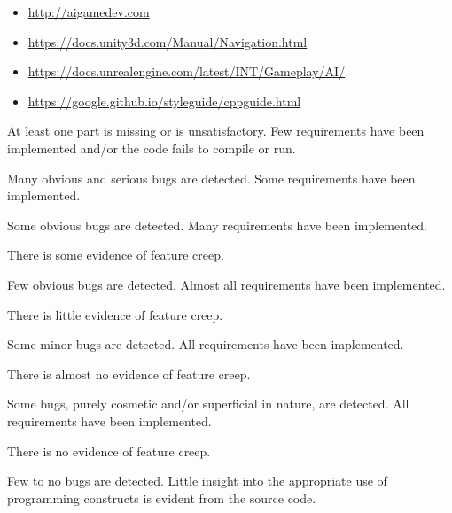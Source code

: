 \begin{itemize}
	\item \url{http://aigamedev.com}
    \item \url{https://docs.unity3d.com/Manual/Navigation.html}
    \item \url{https://docs.unrealengine.com/latest/INT/Gameplay/AI/}
    \item \url{https://google.github.io/styleguide/cppguide.html}
\end{itemize}

\rubricyeartwo
\begin{markingrubric}
		\grade\fail At least one part is missing or is unsatisfactory.
%
        \grade \fail Few requirements have been implemented  and/or the code fails to compile or run.
            \par Many obvious and serious bugs are detected.
        \grade Some requirements have been implemented.
            \par Some obvious bugs are detected.
        \grade Many requirements have been implemented.
            \par There is some evidence of feature creep.
            \par Few obvious bugs  are detected.
        \grade Almost all requirements have been implemented.
            \par There is little evidence of feature creep.
            \par Some minor bugs  are detected.
        \grade All requirements have been implemented.
            \par There is almost no evidence of feature creep.
            \par Some bugs, purely cosmetic and/or superficial in nature, are detected.
        \grade All requirements have been implemented.
            \par There is no evidence of feature creep.
            \par Few to no bugs are detected.
%
        \grade \fail Little insight into the appropriate use of programming constructs is evident from the source code.

\end{markingrubric}
